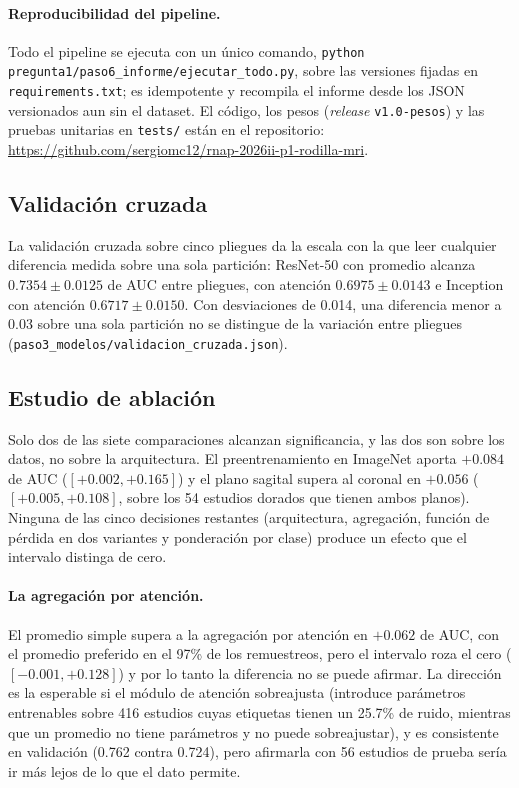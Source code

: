 \documentclass{article}
\begin{document}
\paragraph{Reproducibilidad del pipeline.}
Todo el pipeline se ejecuta con un único comando,
\texttt{python pregunta1/paso6\_informe/ejecutar\_todo.py}, sobre las versiones
fijadas en \texttt{requirements.txt}; es idempotente y recompila el informe desde
los JSON versionados aun sin el dataset. El código, los pesos (\emph{release}
\texttt{v1.0-pesos}) y las pruebas unitarias en \texttt{tests/} están en el
repositorio: \url{https://github.com/sergiomc12/rnap-2026ii-p1-rodilla-mri}.

\subsection{Validación cruzada}
\label{sec:cruzada}

La validación cruzada sobre cinco pliegues da la escala con la que leer cualquier
diferencia medida sobre una sola partición: ResNet-50 con promedio alcanza
$0.7354 \pm 0.0125$ de AUC entre pliegues, con atención $0.6975 \pm 0.0143$ e
Inception con atención $0.6717 \pm 0.0150$. Con desviaciones de 0.014, una
diferencia menor a 0.03 sobre una sola partición no se distingue de la variación
entre pliegues (\texttt{paso3\_modelos/validacion\_cruzada.json}).

\subsection{Estudio de ablación}
\label{sec:ablacion}



Solo dos de las siete comparaciones alcanzan significancia, y las dos
son sobre los datos, no sobre la arquitectura. El preentrenamiento en ImageNet
aporta $+0.084$ de AUC ($[+0.002, +0.165]$) y el plano sagital supera al coronal
en $+0.056$ ($[+0.005, +0.108]$, sobre los 54 estudios dorados que tienen ambos
planos). Ninguna de las cinco decisiones restantes (arquitectura, agregación,
función de pérdida en dos variantes y ponderación por clase) produce un efecto
que el intervalo distinga de cero.

\paragraph{La agregación por atención.} El promedio simple supera a la
agregación por atención en $+0.062$ de AUC, con el promedio preferido en el
97\% de los remuestreos, pero el intervalo roza el cero ($[-0.001, +0.128]$) y
por lo tanto la diferencia no se puede afirmar. La dirección es la esperable si
el módulo de atención sobreajusta (introduce parámetros entrenables sobre 416
estudios cuyas etiquetas tienen un 25.7\% de ruido, mientras que un promedio no
tiene parámetros y no puede sobreajustar), y es consistente en validación
(0.762 contra 0.724), pero afirmarla con 56 estudios de prueba sería ir más
lejos de lo que el dato permite.
\end{document}
